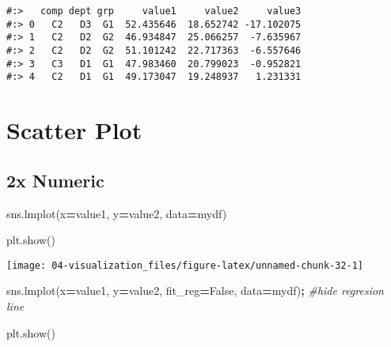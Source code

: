 \documentclass[
]{book}
\newenvironment{Shaded}{\begin{snugshade}}{\end{snugshade}}
\newcommand{\CommentTok}[1]{\textcolor[rgb]{0.37,0.37,0.37}{\textit{#1}}}
\newcommand{\NormalTok}[1]{#1}
\newcommand{\OperatorTok}[1]{\textcolor[rgb]{0.43,0.43,0.43}{\textbf{#1}}}
\newcommand{\StringTok}[1]{\textcolor[rgb]{0.5,0.5,0.5}{#1}}
\newcommand{\VariableTok}[1]{\textcolor[rgb]{0,0,0}{#1}}
\begin{document}
\begin{verbatim}
#:>   comp dept grp     value1     value2     value3
#:> 0   C2   D3  G1  52.435646  18.652742 -17.102075
#:> 1   C2   D2  G2  46.934847  25.066257  -7.635967
#:> 2   C2   D2  G2  51.101242  22.717363  -6.557646
#:> 3   C3   D1  G1  47.983460  20.799023  -0.952821
#:> 4   C2   D1  G1  49.173047  19.248937   1.231331
\end{verbatim}

\hypertarget{scatter-plot-1}{%
\section{Scatter Plot}\label{scatter-plot-1}}

\hypertarget{x-numeric}{%
\subsection{2x Numeric}\label{x-numeric}}

\begin{Shaded}
\begin{Highlighting}[]
\NormalTok{sns.lmplot(x}\OperatorTok{=}\StringTok{\textquotesingle{}value1\textquotesingle{}}\NormalTok{, y}\OperatorTok{=}\StringTok{\textquotesingle{}value2\textquotesingle{}}\NormalTok{, data}\OperatorTok{=}\NormalTok{mydf)}
\end{Highlighting}
\end{Shaded}

\begin{Shaded}
\begin{Highlighting}[]
\NormalTok{plt.show()}
\end{Highlighting}
\end{Shaded}

\texttt{[image: 04-visualization\_files/figure-latex/unnamed-chunk-32-1]}

\begin{Shaded}
\begin{Highlighting}[]
\NormalTok{sns.lmplot(x}\OperatorTok{=}\StringTok{\textquotesingle{}value1\textquotesingle{}}\NormalTok{, y}\OperatorTok{=}\StringTok{\textquotesingle{}value2\textquotesingle{}}\NormalTok{, fit\_reg}\OperatorTok{=}\VariableTok{False}\NormalTok{, data}\OperatorTok{=}\NormalTok{mydf)}\OperatorTok{;}  \CommentTok{\#hide regresion line}
\end{Highlighting}
\end{Shaded}

\begin{Shaded}
\begin{Highlighting}[]
\NormalTok{plt.show()}
\end{Highlighting}
\end{Shaded}
\end{document}
